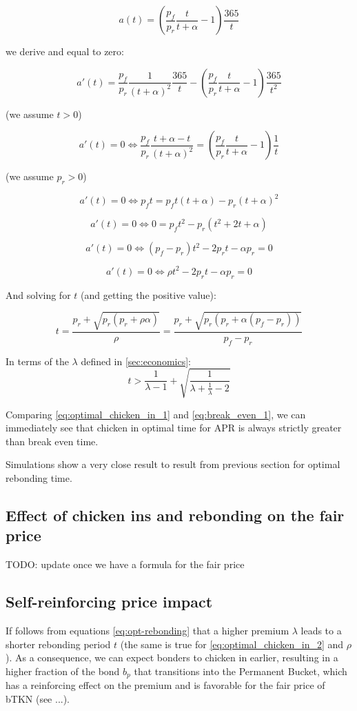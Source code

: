 \documentclass{article}
\begin{document}
\begin{equation}
  \label{eq:apr}
a(t) = \left(\frac{p_f}{p_r} \frac{t}{t+\alpha} - 1\right) \frac{365}{t}
\end{equation}

we derive and equal to zero:

\[
a'(t) = \frac{p_f}{p_r} \frac{1}{(t+\alpha)^2} \frac{365}{t} - \left(\frac{p_f}{p_r} \frac{t}{t+\alpha} - 1\right) \frac{365}{t^2}
\]

(we assume $t > 0$)

\[
a'(t) = 0 \iff \frac{p_f}{p_r} \frac{t+\alpha-t}{(t+\alpha)^2} = \left(\frac{p_f}{p_r} \frac{t}{t+\alpha} - 1\right) \frac{1}{t}
\]

(we assume $p_r > 0$)

\[
a'(t) = 0 \iff p_f t = p_f t(t+\alpha)  - p_r(t+\alpha)^2
\]

\[
a'(t) = 0 \iff 0 = p_f t^2  - p_r(t^2+2t+\alpha)
\]

\[
a'(t) = 0 \iff (p_f-p_r)t^2 - 2p_r t - \alpha p_r = 0
\]

\[
a'(t) = 0 \iff \rho t^2 - 2p_r t -  \alpha p_r = 0
\]

And solving for $t$ (and getting the positive value):

\begin{equation}
  \label{eq:optimal_chicken_in_1}
t = \frac{p_r + \sqrt{p_r(p_r + \rho  \alpha)}}{\rho} = \frac{p_r + \sqrt{p_r (p_r + \alpha (p_f-p_r))}}{p_f-p_r}
\end{equation}

In terms of the $\lambda$ defined in \ref{sec:economics}:
\begin{equation}
  \label{eq:optimal_chicken_in_2}
t > \frac{1}{\lambda-1} + \sqrt{\frac{1}{\lambda + \frac{1}{\lambda} - 2}}
\end{equation}

Comparing \ref{eq:optimal_chicken_in_1} and \ref{eq:break_even_1}, we can immediately see that chicken in optimal time for APR is always strictly greater than break even time.

Simulations show a very close result to result from previous section for optimal rebonding time.

\subsection{Effect of chicken ins and rebonding on the fair price}
TODO: update once we have a formula for the fair price

\subsection{Self-reinforcing price impact}
If follows from equations \ref{eq:opt-rebonding} that a higher premium $\lambda$ leads to a shorter rebonding period $t$ (the same is true for \ref{eq:optimal_chicken_in_2} and $\rho$). As a consequence, we can expect bonders to chicken in earlier, resulting in a higher fraction of the bond $b_p$ that transitions into the Permanent Bucket, which has a reinforcing effect on the premium and is favorable for the fair price of bTKN (see ...).
\end{document}
